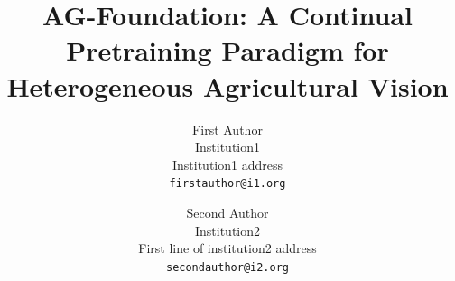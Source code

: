 \documentclass[10pt,twocolumn,letterpaper]{article}
\title{AG-Foundation: A Continual Pretraining Paradigm for Heterogeneous Agricultural Vision}
\author{First Author\\
Institution1\\
Institution1 address\\
{\tt\small firstauthor@i1.org}
\and
Second Author\\
Institution2\\
First line of institution2 address\\
{\tt\small secondauthor@i2.org}
}
\begin{document}
\maketitle

    



{
    \small
    
    
}

% 
\end{document}
